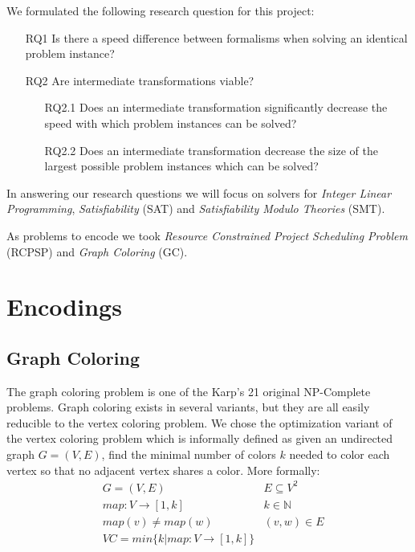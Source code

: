 \documentclass{sig-alternate}
\begin{document}
We formulated the following research question for this project:

\begin{enumerate}
\item[RQ1]{Is there a speed difference between formalisms when solving an identical problem instance?}
\item[RQ2]{Are intermediate transformations viable?}
	\begin{enumerate}
	\item[RQ2.1]{Does an intermediate transformation significantly decrease the speed with which problem instances can be solved?}
	\item[RQ2.2]{Does an intermediate transformation decrease the size of the largest possible problem instances which can be solved?}
	\end{enumerate}
\end{enumerate}

In answering our research questions we will focus on solvers for \emph{Integer Linear Programming}, \emph{Satisfiability} (SAT) and \emph{Satisfiability Modulo Theories} (SMT).

As problems to encode we took \emph{Resource Constrained Project Scheduling Problem} (RCPSP) and \emph{Graph Coloring} (GC).

\section{Encodings}

\subsection{Graph Coloring}

The graph coloring problem is one of the Karp's 21 original NP-Complete problems. \cite{karp1972reducibility}
Graph coloring exists in several variants, but they are all easily reducible to the vertex coloring problem. We chose the optimization variant of the vertex coloring problem which is informally defined as given an undirected graph $G = (V,E)$, find the minimal number of colors $k$ needed to color each vertex so that no adjacent vertex shares a color. More formally:
\begin{subequations}
\begin{align*}
        & G = (V,E) & E \subseteq V^2\\
        & map : V \rightarrow [1,k] & k \in \mathbb{N} \\
        & map(v) \neq map(w) & (v,w) \in E \\
        & VC = min\{k | map : V \rightarrow [1,k]\}
\end{align*}
\end{subequations}
\end{document}
